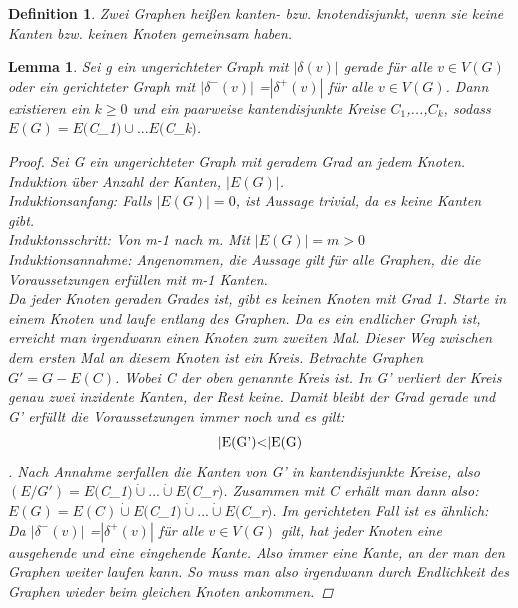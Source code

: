 \documentclass{article}
\newtheorem{definition}[satz]{Definition}
\newtheorem{lemma}[satz]{Lemma}
\begin{document}
  \begin{definition} 
   Zwei Graphen heißen kanten- bzw. knotendisjunkt, wenn sie keine Kanten bzw. keinen Knoten gemeinsam haben.
  \end{definition}
\vspace{\baselineskip}

  \begin{lemma} \lable
    Sei g ein ungerichteter Graph mit $|\delta (v)|$ gerade für alle $v\in V(G)$ oder ein gerichteter Graph mit $|\delta ^-(v)|$ =$|\delta ^+(v)|$ für alle $v\in V(G)$.
    Dann existieren ein $k \geq 0$ und ein paarweise kantendisjunkte Kreise $C_1$,...,$C_k$, sodass $E(G)= E($C_1$) \cup ... E($C_k$)$.
    \begin{proof}
    Sei G ein ungerichteter Graph mit geradem Grad an jedem Knoten.
    Induktion über Anzahl der Kanten, $|E(G)|$.\\
    Induktionsanfang: Falls $|E(G)|=0$, ist Aussage trivial, da es keine Kanten gibt.\\
    Induktonsschritt: Von m-1 nach m. Mit $|E(G)|=m >0$\\
    Induktionsannahme: Angenommen, die Aussage gilt für alle Graphen, die die Voraussetzungen erfüllen mit m-1 Kanten.\\
    Da jeder Knoten geraden Grades ist, gibt es keinen Knoten mit Grad 1. Starte in einem Knoten und laufe entlang des Graphen. Da es ein endlicher Graph ist, erreicht man irgendwann einen Knoten zum zweiten Mal.
    Dieser Weg zwischen dem ersten Mal an diesem Knoten ist ein Kreis.
    Betrachte Graphen $G'=G-E(C)$. Wobei C der oben genannte Kreis ist. 
    In G' verliert der Kreis genau zwei inzidente Kanten, der Rest keine.
    Damit bleibt der Grad gerade und G' erfüllt die Voraussetzungen immer noch und es gilt:\\
    \[$|E(G')<|E(G)$\].
    Nach Annahme zerfallen die Kanten von G' in kantendisjunkte Kreise, also $(E/G')=E($C_1$)\dot\cup... \dot\cup E($C_r$)$.
    Zusammen mit C erhält man dann also: $E(G)= E(C)\dot\cup E($C_1$)\dot\cup...\dot\cup E($C_r$)$.
    Im gerichteten Fall ist es ähnlich:\\
    Da $|\delta ^-(v)|$ =$|\delta ^+(v)|$ für alle $v\in V(G)$ gilt, hat jeder Knoten eine ausgehende und eine eingehende Kante.
    Also immer eine Kante, an der man den Graphen weiter laufen kann. So muss man also irgendwann durch Endlichkeit des Graphen wieder beim gleichen Knoten ankommen.
    \end{proof}
  \end{lemma}
  \vspace{\baselineskip}
\end{document}
